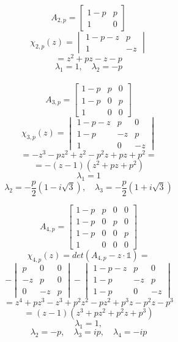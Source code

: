 \begin{enumerate}
  \begin{minipage}{0.4\linewidth}
  \[ A_{2,p} = \begin{bmatrix} 1-p & p \\ 1 & 0 \end{bmatrix} \]
  \[ \chi_{2,p}(z) = \begin{vmatrix} 1-p-z & p \\ 1 & -z \end{vmatrix} \]
  \[ = z^{2} + pz - z - p \]
  \[ \lambda_{1} = 1, \quad \lambda_{2}= -p \] \\[0.5em]
  \[ A_{3,p} = \begin{bmatrix} 1-p & p & 0 \\
                               1-p & 0 & p \\
                                 1 & 0 & 0 \end{bmatrix} \]
  \[ \chi_{3,p}(z) = \begin{vmatrix} 1-p-z & p  & 0 \\
                                       1-p   & -z & p \\
                                       1     & 0  & -z \end{vmatrix} \]
  \[ = -z^{3} - pz^{2} + z^{2} - p^{2}z + pz + p^{2} = \]
  \[ = -(z - 1) (z^{2} + pz + p^{2}) \]
  \[ \lambda_{1}= 1 \]
  \[ \lambda_{2}= -\frac{p}{2}(1 - i\sqrt{3}), \quad
     \lambda_{3}= -\frac{p}{2}(1 + i\sqrt{3}) \]
  \end{minipage}\hfill\begin{minipage}{0.5\linewidth}
  \[ A_{4,p} = \begin{bmatrix} 1-p & p & 0 & 0 \\
                               1-p & 0 & p & 0 \\
                               1-p & 0 & 0 & p \\
                                 1 & 0 & 0 & 0 \end{bmatrix} \]
  \[ \chi_{4,p}(z) = det(A_{4,p} - z\cdot \mathds{1}) = \]
  \[                 -\begin{vmatrix} p & 0 & 0 \\
                                     -z & p & 0 \\
                                      0 &-z & p \end{vmatrix} 
                     -\begin{vmatrix} 1-p-z & p & 0 \\
                                      1-p & -z & p \\
                                      1-p & 0 & -z \end{vmatrix} \]
  \[ = z^4 + pz^3 - z^3 + p^{2}z^2 - pz^2 + p^{3}z - p^{2}z -p^3 \]
  \[ = (z - 1) (z^{3} + pz^{2} + p^{2}z + p^{3}) \]
  \[ \lambda_{1}= 1, \]
  \[ \lambda_{2}= -p, \quad
     \lambda_{3}= ip, \quad
     \lambda_{4}= -ip\]
  \end{minipage}
  

\end{enumerate}
